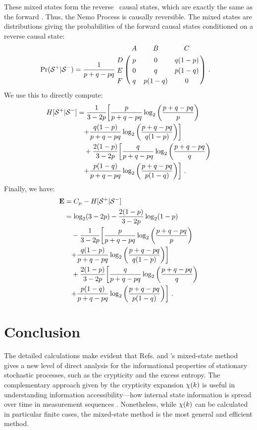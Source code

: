 These mixed states form the reverse \eM\ causal states, which are exactly the
same as the forward \eM. Thus, the Nemo Process is causally reversible. The
mixed states are distributions giving the probabilities of the forward causal
states conditioned on a reverse causal state:
\begin{align*}
\Pr(\FutureCausalState|\PastCausalState) &= \frac{1}{p + q - pq}
\bordermatrix{
  & A & B & C \cr
D & p & 0 & q(1-p) \cr
E & 0 & q & p(1-q) \cr
F & q & p(1-q) & 0 \cr
} ~.
\end{align*}
We use this to directly compute:
\begin{align*}
H[{\mathcal{S}}^{+}|{\mathcal{S}}^{-}] 
    &= \frac{1}{3-2p} \biggl[ \frac{p}{p+q-pq} \log_2 \left(\frac{p+q-pq}{p}\right) \biggl.\\
    &\quad \biggl. + \frac{q(1-p)}{p + q - pq} \log_2 \left(\frac{p+q-pq}{q(1-p)}\right) \biggr]\\
    &\quad +\frac{2(1-p)}{3-2p} \biggl[ \frac{q}{p+q-pq} \log_2 \left(\frac{p+q-pq}{q}\right) \biggr.\\
    &\quad \biggl. + \frac{p(1-q)}{p+q-pq} \log_2
	\left(\frac{p+q-pq}{p(1-q)}\right) \biggr] ~.
\end{align*}
Finally, we have:
\begin{align*}
{\bf E} &= C_\mu - H[{\mathcal{S}}^{+}|{\mathcal{S}}^{-}]\\
    &= \log_2(3-2p) - \frac{2(1-p)}{3-2p} \log_2 (1-p) \\
    &\quad - \frac{1}{3-2p} \biggl[ \frac{p}{p+q-pq} \log_2 \left(\frac{p+q-pq}{p}\right) \biggl.\\
    &\quad \biggl. + \frac{q(1-p)}{p + q - pq} \log_2 \left(\frac{p+q-pq}{q(1-p)}\right) \biggr]\\
    &\quad +\frac{2(1-p)}{3-2p} \biggl[ \frac{q}{p+q-pq} \log_2 \left(\frac{p+q-pq}{q}\right) \biggr.\\
    &\quad \biggl. + \frac{p(1-q)}{p+q-pq} \log_2
	\left(\frac{p+q-pq}{p(1-q)}\right) \biggr] ~.
\end{align*}

\section{Conclusion}

The detailed calculations make evident that Refs. \cite{Crut08a} and
\cite{Crut08b}'s mixed-state method gives a new level of direct analysis for
the informational properties of stationary stochastic processes, such as the
crypticity and the excess entropy. The complementary approach given by the
crypticity expansion $\chi(k)$ is useful in understanding information
accessibility---how internal state information is spread over time in
measurement sequences \cite{Maho09a}. Nonetheless, while $\chi(k)$ can be
calculated in particular finite cases, the mixed-state method is the most
general and efficient method.


\ifx\master\undefined\fi
